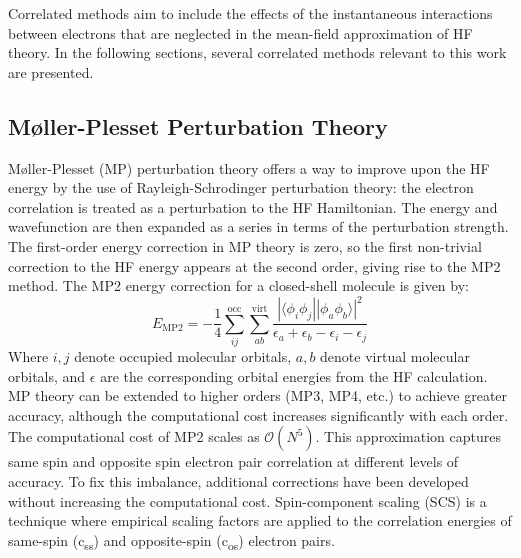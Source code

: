 Correlated methods aim to include the effects of the instantaneous interactions between electrons that are neglected in the mean-field approximation of HF theory. In the following sections, several correlated methods relevant to this work are presented.


\subsection{Møller-Plesset Perturbation Theory}
Møller-Plesset (MP)\cite{shavitt2009many} perturbation theory offers a way to improve upon the HF energy by the use of Rayleigh-Schrodinger perturbation theory: the electron correlation is treated as a perturbation to the HF Hamiltonian. The energy and wavefunction are then expanded as a series in terms of the perturbation strength. The first-order energy correction in MP theory is zero, so the first non-trivial correction to the HF energy appears at the second order, giving rise to the MP2 method. The MP2 energy correction for a closed-shell molecule is given by:
\begin{equation} \label{eq:MP2}
    E_{\mathrm{MP2}} = - \frac{1}{4} \sum_{ij}^{\mathrm{occ}} \sum_{ab}^{\mathrm{virt}} \frac{|\langle \phi_i \phi_j || \phi_a \phi_b \rangle|^2}{\epsilon_a + \epsilon_b - \epsilon_i - \epsilon_j}
\end{equation}
Where $i,j$ denote occupied molecular orbitals, $a,b$ denote virtual molecular orbitals, and $\epsilon$ are the corresponding orbital energies from the HF calculation. MP theory can be extended to higher orders (MP3, MP4, etc.) to achieve greater accuracy, although the computational cost increases significantly with each order. The computational cost of MP2 scales as $\mathcal{O}(N^5)$. This approximation captures same spin and opposite spin electron pair correlation at different levels of accuracy. To fix this imbalance, additional corrections have been developed without increasing the computational cost. Spin-component scaling (SCS)\cite{grimme2003improved} is a technique where empirical scaling factors are applied to the correlation energies of same-spin (c\textsubscript{ss}) and opposite-spin (c\textsubscript{os}) electron pairs.

